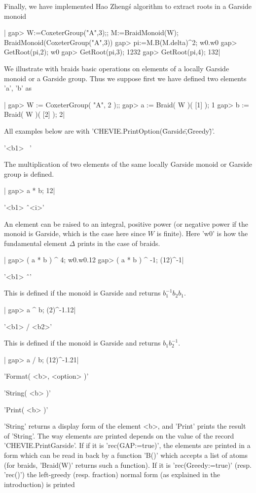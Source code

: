 Finally, we have implemented Hao Zheng\'s algorithm to extract roots
in a Garside monoid\:

|    gap> W:=CoxeterGroup("A",3);; M:=BraidMonoid(W);
    BraidMonoid(CoxeterGroup("A",3))
    gap> pi:=M.B(M.delta)^2;
    w0.w0
    gap> GetRoot(pi,2);
    w0
    gap> GetRoot(pi,3);
    1232
    gap> GetRoot(pi,4);
    132|


We illustrate with braids basic operations on elements of a locally Garside
monoid  or  a  Garside  group.  Thus  we  suppose first we have defined two
elements 'a', 'b' as

|    gap> W := CoxeterGroup( "A", 2 );;
    gap> a := Braid( W )( [1] );
    1
    gap> b := Braid( W )( [2] );
    2|

All examples below are with 'CHEVIE.PrintOption(\"Garside\",\"Greedy\")'.

'<b1> \*\ <b2>'

The multiplication of two elements of the same locally Garside monoid or
Garside group is defined.

|    gap> a * b;
    12|

'<b1> \^\ <i>'

An  element can be raised to an integral, positive power (or negative power
if the monoid is Garside, which is the case here since $W$ is finite). Here
'w0' is how the fundamental element $\Delta$ prints in the case of braids.

|    gap> ( a * b ) ^ 4;
    w0.w0.12
    gap> ( a * b ) ^ -1;
    (12)^-1|

'<b1> \^\ <b2>'

This is defined if the monoid is Garside and returns $b_1^{-1}b_2b_1$.

|    gap> a ^ b;
    (2)^-1.12|

'<b1> / <b2>'

This is defined if the monoid is Garside and returns $b_1b_2^{-1}$.

|    gap> a / b;
    (12)^-1.21|

'Format( <b>, <option> )'

'String( <b> )'

'Print( <b> )'

'String'  returns a display form of the element <b>, and 'Print' prints the
result  of 'String'. The way  elements are printed depends  on the value of
the  record  'CHEVIE.PrintGarside'.  If  if  it  is  'rec(GAP:=true)',  the
elements  are printed  in a  form which  can be  read in back by a function
'B()'  which accepts a list of atoms (for braids, 'Braid(W)' returns such a
function).  If it  is 'rec(Greedy:=true)'  (resp. 'rec()')  the left-greedy
(resp.  fraction)  normal  form  (as  explained  in  the  introduction)  is
printed\:


